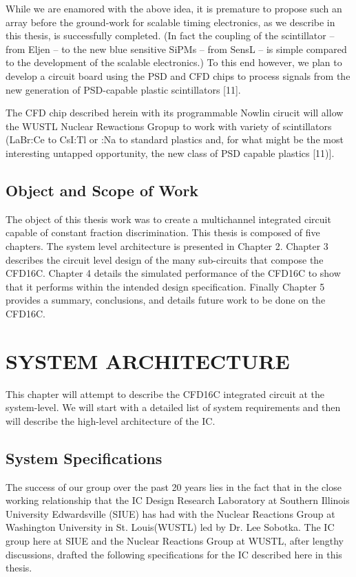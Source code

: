 \documentclass[12pt,oneside,final]{siuethesis}
\theoremstyle{definition}
\begin{document}
While we are enamored with the above idea, it is premature to propose such an array before the ground-work for scalable timing electronics, as we describe in this thesis, is successfully completed. (In fact the coupling of the scintillator – from Eljen – to the new blue sensitive SiPMs – from SensL – is simple compared to the development of the scalable electronics.) To this end however, we plan to develop a circuit board using the PSD and CFD chips to process signals from the new generation of PSD-capable plastic scintillators [11]. 

The CFD chip described herein with its programmable Nowlin cirucit will allow the WUSTL Nuclear Rewactions Gropup to work with variety of scintillators (LaBr:Ce to CsI:Tl or :Na to standard plastics and, for what might be the most interesting untapped opportunity, the new class of PSD capable plastics [11)].  


\section{Object and Scope of Work} 

\par The object of this thesis work was to create a multichannel integrated circuit capable of constant fraction discrimination. This thesis is composed of five chapters. The system level architecture is presented in Chapter 2. Chapter 3 describes the circuit level design of the many sub-circuits that compose the CFD16C. Chapter 4 details the simulated performance of the CFD16C to show that it performs within the intended design specification. Finally Chapter 5 provides a summary, conclusions, and details future work to be done on the CFD16C.



\chapter{SYSTEM ARCHITECTURE}

This chapter will attempt to describe the CFD16C integrated circuit at the system-level.  We will start with a detailed list of system requirements and then will describe the high-level architecture of the IC.

\section{System Specifications}
The success of our group over the past 20 years lies in the fact that in the close working relationship that the IC Design Research Laboratory at Southern Illinois University Edwardsville (SIUE) has had with the Nuclear Reactions Group at Washington University in St. Louis(WUSTL) led by Dr. Lee Sobotka.  The IC group here at SIUE and the Nuclear Reactions Group at WUSTL, after lengthy discussions, drafted the following specifications for the IC described here in this thesis.
\end{document}
